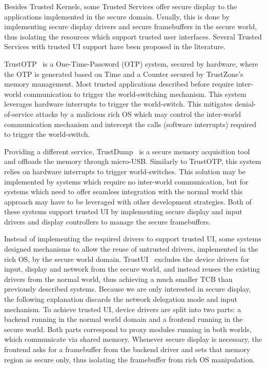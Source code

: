
Besides Trusted Kernels, some Trusted Services offer secure display to the applications implemented in the secure domain. Usually, this is done by implementing secure display drivers and secure framebuffers in the secure world, thus isolating the resources which support trusted user interfaces. Several Trusted Services with trusted UI support have been proposed in the literature.

TrustOTP~\cite{sun2015trustotp} is a One-Time-Password (OTP) system, secured by hardware, where the OTP is generated based on Time and a Counter secured by TrustZone's memory management. Most trusted applications described before require inter-world communication to trigger the world-switching mechanism. This system leverages hardware interrupts to trigger the world-switch. This mitigates denial-of-service attacks by a malicious rich OS which may control the inter-world communication mechanism and intercept the calls (software interrupts) required to trigger the world-switch. 

Providing a different service, TrustDump~\cite{sun2015reliable} is a secure memory acquisition tool and offloads the memory through micro-USB. Similarly to TrustOTP, this system relies on hardware interrupts to trigger world-switches. This solution may be implemented by systems which require no inter-world communication, but for systems which need to offer seamless integration with the normal world this approach may have to be leveraged with other development strategies. Both of these systems support trusted UI by implementing secure display and input drivers and display controllers to manage the secure framebuffers.

Instead of implementing the required drivers to support trusted UI, some systems designed mechanisms to allow the reuse of untrusted drivers, implemented in the rich OS, by the secure world domain.
TrustUI~\cite{li2014building} excludes the device drivers for input, display and network from the secure world, and instead reuses the existing drivers from the normal world, thus achieving a much smaller TCB than previously described systems. Because we are only interested in secure display, the following explanation discards the network delegation mode and input mechanism. To achieve trusted UI, device drivers are split into two parts: a backend running in the normal world domain and a frontend running in the secure world. Both parts correspond to proxy modules running in both worlds, which communicate via shared memory. Whenever secure display is necessary, the frontend asks for a framebuffer from the backend driver and sets that memory region as secure only, thus isolating the framebuffer from rich OS manipulation. 

